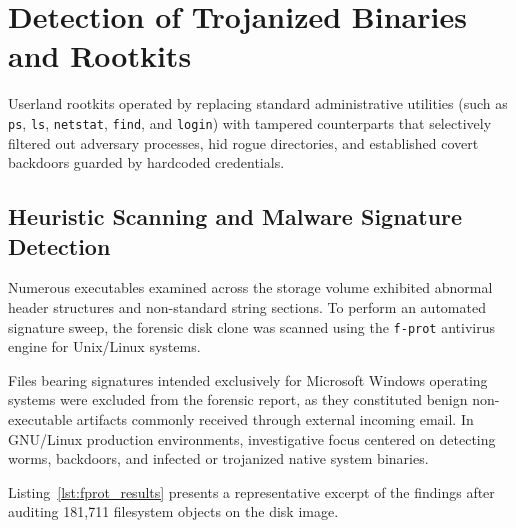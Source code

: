 \chapter{Detection of Trojanized Binaries and Rootkits}

Userland rootkits operated by replacing standard administrative utilities (such as \texttt{ps}, \texttt{ls}, \texttt{netstat}, \texttt{find}, and \texttt{login}) with tampered counterparts that selectively filtered out adversary processes, hid rogue directories, and established covert backdoors guarded by hardcoded credentials.

\section{Heuristic Scanning and Malware Signature Detection}

Numerous executables examined across the storage volume exhibited abnormal header structures and non-standard string sections. To perform an automated signature sweep, the forensic disk clone was scanned using the \texttt{f-prot} antivirus engine for Unix/Linux systems.

Files bearing signatures intended exclusively for Microsoft Windows operating systems were excluded from the forensic report, as they constituted benign non-executable artifacts commonly received through external incoming email. In GNU/Linux production environments, investigative focus centered on detecting worms, backdoors, and infected or trojanized native system binaries.

Listing~\ref{lst:fprot_results} presents a representative excerpt of the findings after auditing 181,711 filesystem objects on the disk image.

